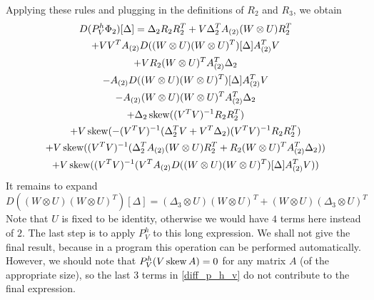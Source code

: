 Applying these rules and plugging in the definitions of $R_2$ and $R_3$, we obtain
\begin{multline}
    \label{diff_p_h_v}
 D(P^h_V \Phi_2) [ \Delta ] = \Delta_2 R_2 R_2^T + V \Delta_2^T A_{(2)} (W \otimes U) R_2^T \\ 
 + V V^T A_{(2)} D ( ( W \otimes U)(W \otimes U)^T ) [\Delta] A_{(2)}^T V \\
+ V R_2 (W \otimes U)^T A_{(2)}^T \Delta_2  \\
 - A_{(2)} D ( ( W \otimes U)(W \otimes U)^T ) [\Delta] A_{(2)}^T V \\
-  A_{(2)}  ( W \otimes U)(W \otimes U)^T A_{(2)}^T \Delta_2 \\
+ \Delta_2 \operatorname*{skew} ( (V^T V)^{-1} R_2 R_2^T ) \\
+ V \operatorname*{skew} ( - (V^T V)^{-1} ( \Delta_2^T V + V^T \Delta_2) (V^T V)^{-1} R_2 R_2^T) \\ 
+  V \operatorname*{skew} ( (V^T V)^{-1} ( \Delta_2^T A_{(2)} ( W \otimes U) R_2^T + R_2 (W \otimes U)^T A_{(2)}^T \Delta_2 ) ) \\
+  V \operatorname*{skew} ( (V^T V)^{-1} ( V^T A_{(2)} D ( ( W \otimes U)(W \otimes U)^T)[\Delta]  A_{(2)}^T V ) ) 
\end{multline}
It remains to expand
\begin{equation}
D( ( W \otimes U)(W \otimes U)^T ) [\Delta] = ( \Delta_3 \otimes U) (W \otimes U)^T  + ( W \otimes U )( \Delta_3 \otimes U)^T 
\end{equation}
Note that $U$ is fixed to be identity, otherwise we would have $4$ terms here instead of $2$.
The last step is to apply $P^h_V$ to this long expression. We shall not give the final result,
because in a program this operation can be performed automatically.
However, we should note that $P^h_V(V \operatorname*{skew} A) = 0$ for any matrix $A$ (of the appropriate size),
so the last $3$ terms in \eqref{diff_p_h_v} do not contribute to the final expression.

